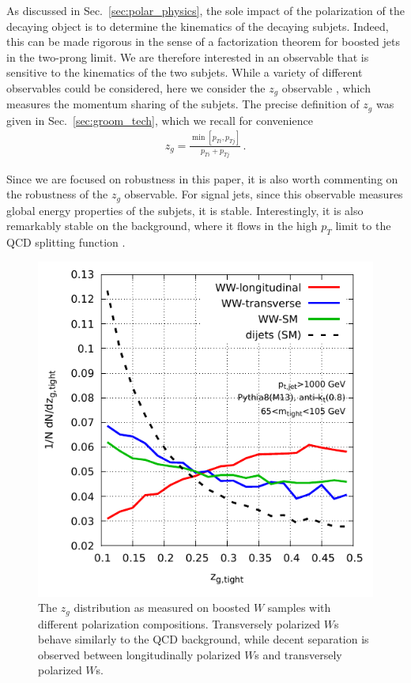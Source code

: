 \documentclass[11pt,letterpaper]{article}
\DeclareRobustCommand{\Sec}[1]{Sec.~\ref{#1}}
\begin{document}
As discussed in \Sec{sec:polar_physics}, the sole impact of the polarization of the decaying object is to determine the kinematics of the decaying subjets.
%
Indeed, this can be made rigorous in the sense of a factorization theorem for boosted jets in the two-prong limit.
%
We are therefore interested in an observable that is sensitive to the kinematics of the two subjets.
%
While a variety of different observables could be considered, here we consider the $z_g$ observable \cite{Larkoski:2014wba,Larkoski:2014bia,Larkoski:2015lea}, which measures the momentum sharing of the subjets. The precise definition of $z_g$ was given in \Sec{sec:groom_tech}, which we recall for convenience
\begin{align}
z_g=\frac{\min\left[ p_{Ti}, p_{Tj}  \right]}{p_{Ti}+p_{Tj}}\,.
\end{align}

Since we are focused on robustness in this paper, it is also worth commenting on the robustness of the $z_g$ observable. For signal jets, since this observable measures global energy properties of the subjets, it is stable.
%
Interestingly, it is also remarkably stable on the background, where it flows in the high $p_T$ limit to the QCD splitting function \cite{Larkoski:2014wba,Larkoski:2014bia,Larkoski:2015lea}.

\begin{figure}
\begin{center}
\includegraphics[width=0.45\columnwidth]{figures/polarisation-zg-distrib}
\end{center}
\caption{The $z_g$ distribution as measured on boosted $W$ samples with different polarization compositions. Transversely polarized $W$s behave similarly to the QCD background, while decent separation is observed between longitudinally polarized $W$s and transversely polarized $W$s.}
\label{z_g_dist}
\end{figure}
\end{document}
